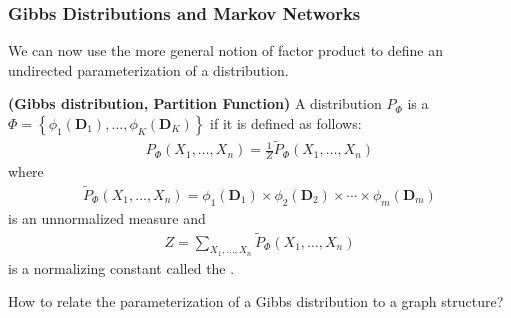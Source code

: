 \documentclass{article}
\newcommand{\bfs}[1]{\textbf{({#1}) }}
\begin{document}
\subsubsection{Gibbs Distributions and Markov Networks}
We can now use the more general notion of factor product to define an undirected parameterization of a distribution.
\begin{defa}\bfs{Gibbs distribution, Partition Function}\label{def:xzda}
 A distribution $P_{\Phi}$ is a  $\Phi=\left\{\phi_{1}\left(\boldsymbol{D}_{1}\right), \ldots, \phi_{K}\left(\boldsymbol{D}_{K}\right)\right\}$ if it is defined as follows:
\begin{align}
P_{\Phi}\left(X_{1}, \ldots, X_{n}\right)=\frac{1}{Z} \tilde{P}_{\Phi}\left(X_{1}, \ldots, X_{n}\right)\label{eq:jeaxc}
\end{align}
where
\begin{align*}
\tilde{P}_{\Phi}\left(X_{1}, \ldots, X_{n}\right)=\phi_{1}\left(\boldsymbol{D}_{1}\right) \times \phi_{2}\left(\boldsymbol{D}_{2}\right) \times \cdots \times \phi_{m}\left(\boldsymbol{D}_{m}\right)
\end{align*}
is an unnormalized measure and
\begin{align*}
Z=\sum_{X_{1}, \ldots, X_{n}} \tilde{P}_{\Phi}\left(X_{1}, \ldots, X_{n}\right)
\end{align*}
is a normalizing constant called the .
\end{defa}
  How to relate the parameterization of a Gibbs distribution to a graph structure?
\end{document}
